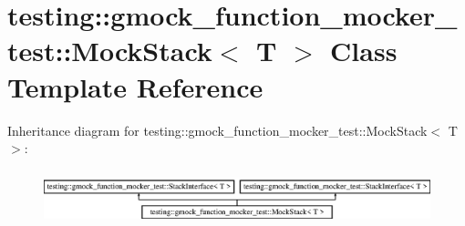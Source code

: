\hypertarget{classtesting_1_1gmock__function__mocker__test_1_1_mock_stack}{}\section{testing\+::gmock\+\_\+function\+\_\+mocker\+\_\+test\+::Mock\+Stack$<$ T $>$ Class Template Reference}
\label{classtesting_1_1gmock__function__mocker__test_1_1_mock_stack}
Inheritance diagram for testing\+::gmock\+\_\+function\+\_\+mocker\+\_\+test\+::Mock\+Stack$<$ T $>$\+:\begin{figure}[H]
\begin{center}
\leavevmode
\includegraphics[height=1.637427cm]{d0/de1/classtesting_1_1gmock__function__mocker__test_1_1_mock_stack}
\end{center}
\end{figure}
